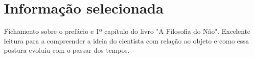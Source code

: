 \documentclass[11pt]{article}
\begin{document}
\section{Informação selecionada}
    Fichamento sobre o prefácio e 1º capítulo do livro "A Filosofia do Não".
    Excelente leitura para a compreender a ideia do cientista com relação ao objeto e como essa postura evoluiu com o passar dos tempos.



\end{document}
